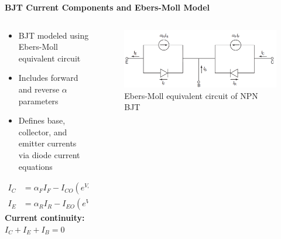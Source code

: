 \begin{frame}{\textbf{BJT Current Components and Ebers-Moll Model}}
        \begin{columns}
    \begin{column}{0.4\textwidth}
        \begin{itemize}
            \item BJT modeled using Ebers-Moll equivalent circuit
            \item Includes forward and reverse $\alpha$ parameters
            \item Defines base, collector, and emitter currents via diode current equations
        \end{itemize}
        \begin{align*}
        I_C &= \alpha_F I_F - I_{CO}(e^{V_{CE}/V_T} - 1) \\
        I_E &= \alpha_R I_R - I_{EO}(e^{V_{EC}/V_T} - 1)
        \end{align*}
        \textbf{Current continuity:} $I_C + I_E + I_B = 0$
    \end{column}
    \begin{column}{0.6\textwidth}
        \begin{figure}
            \centering
            \includegraphics[width=0.8\linewidth]{fig/lec04/NPN_BJT_eq_model.png}
            \caption{Ebers-Moll equivalent circuit of NPN BJT}
        \end{figure}
    \end{column}
  \end{columns}
\end{frame}

